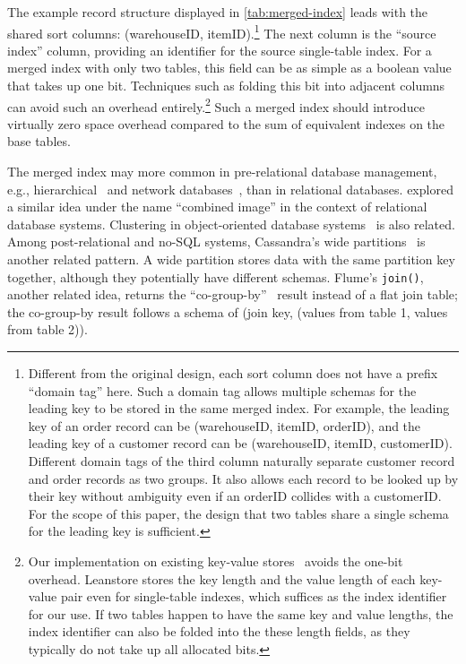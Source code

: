 \documentclass[biblatex, english]{lni}
\begin{document}
The example record structure displayed in \cref{tab:merged-index} leads with the shared sort columns: (warehouseID, itemID).\footnote{
    Different from the original design, each sort column does not have a prefix ``domain tag'' here.
    Such a domain tag allows multiple schemas for the leading key to be stored in the same merged index.
    For example, the leading key of an order record can be (warehouseID, itemID, orderID), and the leading key of a customer record can be (warehouseID, itemID, customerID).
    Different domain tags of the third column naturally separate customer record and order records as two groups.
    It also allows each record to be looked up by their key without ambiguity even if an orderID collides with a customerID.
    For the scope of this paper, the design that two tables share a single schema for the leading key is sufficient.
}
The next column is the ``source index'' column, providing an identifier for the source single-table index.
For a merged index with only two tables, this field can be as simple as a boolean value that takes up one bit.
Techniques such as folding this bit into adjacent columns can avoid such an overhead entirely.\footnote{
    Our implementation on existing key-value stores~\cite{leanstore18,rocksdb21} avoids the one-bit overhead.
    Leanstore stores the key length and the value length of each key-value pair even for single-table indexes, which suffices as the index identifier for our use.
    If two tables happen to have the same key and value lengths, the index identifier can also be folded into the these length fields, as they typically do not take up all allocated bits.
}
Such a merged index should introduce virtually zero space overhead compared to the sum of equivalent indexes on the base tables.

The merged index may more common in pre-relational database management, e.g., hierarchical~\cite{Domdouzis2021} and network databases~\cite{Lake2013}, than in relational databases.
 explored a similar idea under the name ``combined image'' in the context of relational database systems.
Clustering in object-oriented database systems~\cite{DARMONT199655} is also related.
Among post-relational and no-SQL systems, Cassandra's wide partitions~\cite[91]{carpenter2022cassandra} is another related pattern.
A wide partition stores data with the same partition key together, although they potentially have different schemas.
Flume's \texttt{join()}, another related idea, returns the ``co-group-by''~\cite{beam2024cogroupbykey} result instead of a flat join table; the co-group-by result follows a schema of (join key, (values from table 1, values from table 2)).
\end{document}
